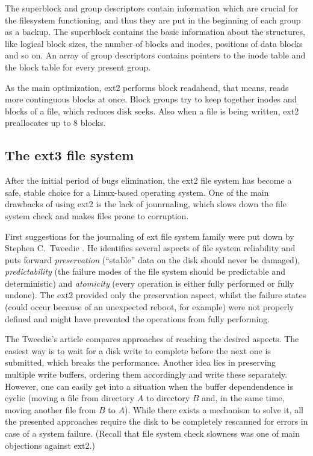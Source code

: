 \documentclass{acm_proc_article-sp}
\begin{document}
The superblock and group descriptors contain information which are crucial for the filesystem functioning, and thus they are put in the beginning of each group as a backup. The superblock contains the basic information about the structures, like logical block sizes, the number of blocks and inodes, positions of data blocks and so on. An array of group descriptors contains pointers to the inode table and the block table for every present group.

As the main optimization, ext2 performs block readahead, that means, reads more continguous blocks at once. Block groups try to keep together inodes and blocks of a file, which reduces disk seeks. Also when a file is being written, ext2 preallocates up to 8 blocks.

\subsection{The ext3 file system}

After the initial period of bugs elimination, the ext2 file system has become a safe, stable choice for a Linux-based operating system. One of the main drawbacks of using ext2 is the lack of jounrnaling, which slows down the file system check and makes files prone to corruption.

First suggestions for the journaling of ext file system family were put down by Stephen C.\ Tweedie \cite{extjournal}. He identifies several aspects of file system reliability and puts forward {\it preservation} (``stable'' data on the disk should never be damaged), {\it predictability} (the failure modes of the file system should be predictable and deterministic) and {\it atomicity} (every operation is either fully performed or fully undone). The ext2 provided only the preservation aspect, whilst the failure states (could occur because of an unexpected reboot, for example) were not properly defined and might have prevented the operations from fully performing.

The Tweedie's article \cite{extjournal} compares approaches of reaching the desired aspects. The easiest way is to wait for a disk write to complete before the next one is submitted, which breaks the performance. Another idea lies in preserving multiple write buffers, ordering them accordingly and write these separately. However, one can easily get into a situation when the buffer dependendence is cyclic (moving a file from directory $A$ to directory $B$ and, in the same time, moving another file from $B$ to $A$). While there exists a mechanism to solve it, all the presented approaches require the disk to be completely rescanned for errors in case of a system failure. (Recall that file system check slowness was one of main objections against ext2.)
\end{document}
